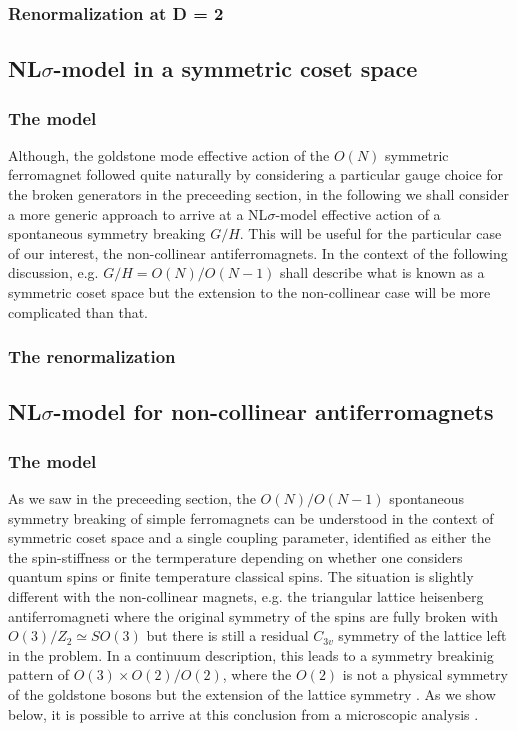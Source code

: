 \documentclass[notitlepage,onecolumn,showpacs,11pt]{revtex4-1}
\begin{document}
\subsubsection{Renormalization at D = 2}

\subsection{NL$\sigma$-model in a symmetric coset space}

\subsubsection{The model}

Although, the goldstone mode effective action of the $O(N)$ symmetric ferromagnet
followed quite naturally by considering a particular gauge choice for the broken generators
in the preceeding section, in the following we shall consider a more generic approach
to arrive at a NL$\sigma$-model effective action of a spontaneous symmetry breaking 
$G/H$. This will be useful for the particular case of our interest, the non-collinear 
antiferromagnets. In the context of the following discussion, e.g. $G/H=O(N)/O(N-1)$ shall 
describe what is known as a symmetric coset space but the extension to the non-collinear case
will be more complicated than that.

\subsubsection{The renormalization}

\subsection{NL$\sigma$-model for non-collinear antiferromagnets}

\subsubsection{The model}

As we saw in the preceeding section, the $O(N)/O(N-1)$ spontaneous symmetry breaking of 
simple ferromagnets can be understood in the context of symmetric coset space and a 
single coupling parameter, identified as either the the spin-stiffness or the termperature
depending on whether one considers quantum spins or finite temperature classical spins. The
situation is slightly different with the non-collinear magnets, e.g. the triangular lattice 
heisenberg antiferromagneti where the original symmetry of the spins are fully broken 
with $O(3)/Z_2\simeq SO(3)$ but there is still a residual $C_{3v}$ symmetry of the lattice
left in the problem. In a continuum description, this leads to a symmetry breakinig pattern
of $O(3)\times O(2)/O(2)$, where the $O(2)$ is not a physical symmetry of the goldstone
bosons but the extension of the lattice symmetry \cite{azaria-93}. As we show below, it is
possible to arrive at this conclusion from a microscopic analysis \cite{dombre-88}. 
\end{document}
